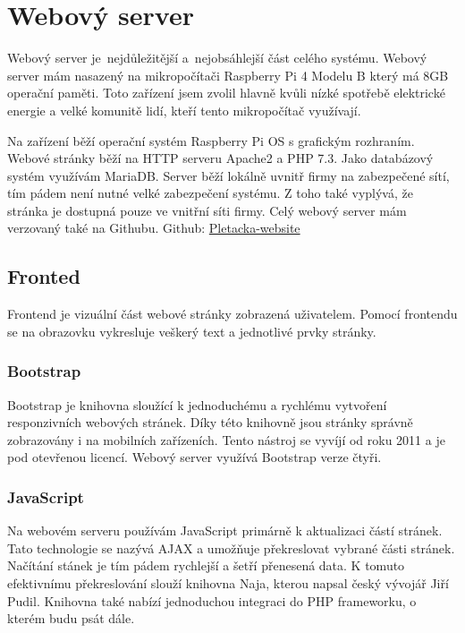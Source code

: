 \chapter{Webový server}
Webový server je~nejdůležitější a~nejobsáhlejší část celého systému. 
Webový server mám nasazený na mikropočítači Raspberry Pi 4 Modelu B který má 8GB operační paměti.
Toto zařízení jsem zvolil hlavně kvůli nízké spotřebě elektrické energie a velké komunitě lidí, kteří tento mikropočítač využívají.

Na zařízení běží operační systém Raspberry Pi OS s grafickým rozhraním.
Webové stránky běží na HTTP serveru Apache2 a PHP 7.3.
Jako databázový systém využívám MariaDB.
Server běží lokálně uvnitř firmy na zabezpečené sítí, tím pádem není nutné velké zabezpečení systému.
\fxnote[author=JA]{\textcolor{mygreen}{Zabezpečení jinak přepsat}}
Z toho také vyplývá, že stránka je dostupná pouze ve vnitřní síti firmy.  
Celý webový server mám verzovaný také na Githubu.\newline
Github: \href{https://github.com/Pletacka-IoT/Pletacka-website}{Pletacka-website}\cite{PL_WEB}

\section{Fronted}
 
Frontend je vizuální část webové stránky zobrazená uživatelem.
Pomocí frontendu se na obrazovku vykresluje veškerý text a jednotlivé prvky stránky.

\subsection{Bootstrap}
Bootstrap je knihovna sloužící k jednoduchému a rychlému vytvoření responzivních webových stránek.
Díky této knihovně jsou stránky správně zobrazovány i na mobilních zařízeních.
Tento nástroj se vyvíjí od roku 2011 a je pod otevřenou licencí.
Webový server využívá Bootstrap verze čtyři.


\subsection{JavaScript}
Na webovém serveru používám JavaScript primárně k aktualizaci částí stránek.
Tato technologie se nazývá AJAX a umožňuje překreslovat vybrané části stránek.
Načítání stánek je tím pádem rychlejší a šetří přenesená data.
K tomuto efektivnímu překreslování slouží knihovna Naja\cite{NAJA}, kterou napsal český vývojář Jiří Pudil.
Knihovna také nabízí jednoduchou integraci do PHP frameworku, o kterém budu psát dále.   



